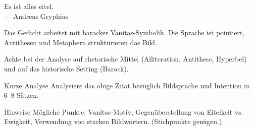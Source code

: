 \documentclass[11pt,a4paper,oneside]{article}
\begin{document}
	\begin{zitat}
		Es ist alles eitel. \\
		— Andreas Gryphius
	\end{zitat}
	
	\begin{interpret}
		Das Gedicht arbeitet mit barocker Vanitas-Symbolik. Die Sprache ist pointiert, Antithesen und Metaphern strukturieren das Bild.
	\end{interpret}
	
	\begin{hinweis}
		Achte bei der Analyse auf rhetorische Mittel (Alliteration, Antithese, Hyperbel) und auf das historische Setting (Barock).
	\end{hinweis}
	
	\begin{aufgabe}{Kurze Analyse}
		Analysiere das obige Zitat bezüglich Bildsprache und Intention in 6–8 Sätzen.
	\end{aufgabe}
	
	\begin{loesung}{Hinweise}
		Mögliche Punkte: Vanitas-Motiv, Gegenüberstellung von Eitelkeit vs. Ewigkeit, Verwendung von starken Bildwörtern. (Stichpunkte genügen.)
	\end{loesung}
	
\end{document}
